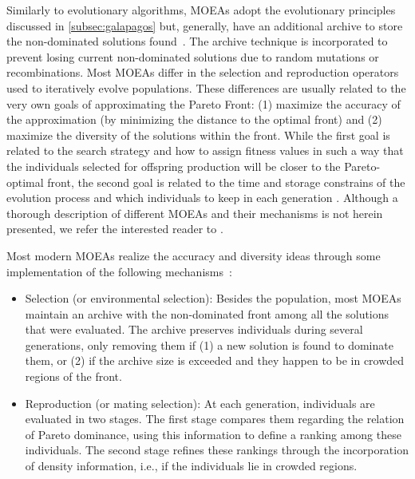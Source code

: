 Similarly to evolutionary algorithms, \acp{MOEA} adopt the evolutionary principles discussed in \cref{subsec:galapagos} but, generally, have an additional archive to store the non-dominated solutions found~\cite{Zitzler2001SPEA2}. The archive technique is incorporated to prevent losing current non-dominated solutions due to random mutations or recombinations. Most \acp{MOEA} differ in the selection and reproduction operators used to iteratively evolve populations. These differences are usually related to the very own goals of approximating the Pareto Front: (1) maximize the accuracy of the approximation (by minimizing the distance to the optimal front) and (2) maximize the diversity of the solutions within the front. While the first goal is related to the search strategy and how to assign fitness values in such a way that the individuals selected for offspring production will be closer to the Pareto-optimal front, the second goal is related to the time and storage constrains of the evolution process and which individuals to keep in each generation \cite{Zitzler2001SPEA2}. Although a thorough description of different \acp{MOEA} and their mechanisms is not herein presented, we refer the interested reader to \cite{Zhou2011}. 

Most modern \acp{MOEA} realize the accuracy and diversity ideas through some implementation of the following mechanisms~\cite{Zitzler2001SPEA2}:	
\begin{itemize}
	\item Selection (or environmental selection): Besides the population, most \acp{MOEA} maintain an archive with the non-dominated front among all the solutions that were evaluated. The archive preserves individuals during several generations, only removing them if (1) a new solution is found to dominate them, or (2) if the archive size is exceeded and they happen to be in crowded regions of the front.
	
	\item Reproduction (or mating selection): At each generation, individuals are evaluated in two stages. The first stage compares them regarding the relation of Pareto dominance, using this information to define a ranking among these individuals. The second stage refines these rankings through the incorporation of density information, i.e., if the individuals lie in crowded regions.
\end{itemize}

